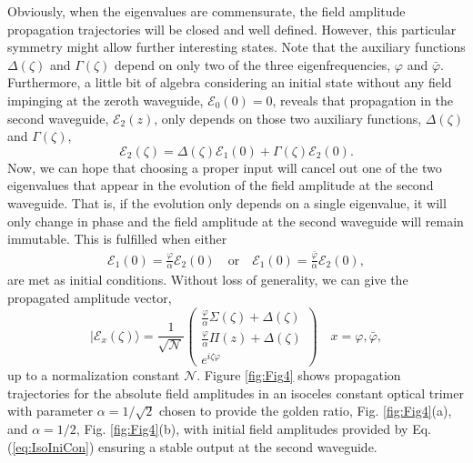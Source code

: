 \documentclass[9pt,twocolumn,twoside]{osajnl}
\begin{document}
Obviously, when the eigenvalues are commensurate, the field amplitude propagation trajectories will be closed and well defined. 
However, this particular symmetry might allow further interesting states.
Note that the auxiliary functions $\Delta(\zeta)$ and $\Gamma(\zeta)$ depend on only two of the three eigenfrequencies, $\varphi$ and $\bar{\varphi}$. 
Furthermore, a little bit of algebra considering an initial state without any field impinging at the zeroth waveguide, $\mathcal{E}_{0}(0)=0$, reveals that propagation in the second waveguide, $\mathcal{E}_{2}(z)$, only depends on those two auxiliary functions, $\Delta(\zeta)$ and $\Gamma(\zeta)$,
\begin{equation}
\mathcal{E}_{2}(\zeta) = \Delta(\zeta)\mathcal{E}_{1}(0)
+\Gamma(\zeta)\mathcal{E}_{2}(0).
\end{equation}
Now, we can hope that choosing a proper input will cancel out one of the two 
eigenvalues that appear in the evolution of the field amplitude at the second waveguide.
That is, if the evolution only depends on a single eigenvalue, it will only change in phase and the field amplitude at the second waveguide will remain immutable. 
This is fulfilled when either 
\begin{eqnarray}
\mathcal{E}_{1}(0)= \frac{\varphi}{\alpha} \mathcal{E}_{2}(0)\quad \mathrm{or} \quad
\mathcal{E}_{1}(0)= \frac{\bar{\varphi}}{\alpha} \mathcal{E}_{2}(0), \label{eq:IsoIniCon}
\end{eqnarray}
are met as initial conditions.
Without loss of generality, we can give the propagated amplitude vector,
\begin{equation} \label{eq:StatAmp}
\vert \mathcal{E}_{x}(\zeta) \rangle = \frac{1}{\sqrt{\mathcal{N}}}\left( \begin{array}{c}
\frac{\varphi}{\alpha} \Sigma(\zeta) + \Delta(\zeta) \\
\frac{\varphi}{\alpha} \Pi(z) + \Delta(\zeta) \\
e^{i\zeta\varphi}
\end{array} \right)	\quad x= \varphi, \bar{\varphi},
\end{equation}
up to a normalization constant $\mathcal{N}$.
Figure \ref{fig:Fig4} shows propagation trajectories for the absolute field amplitudes in an isoceles constant optical trimer with parameter $\alpha = 1 /\sqrt{2}$ chosen to provide the golden ratio, Fig. \ref{fig:Fig4}(a), and  $\alpha = 1/ 2$, Fig. \ref{fig:Fig4}(b), with initial field amplitudes provided by Eq.(\ref{eq:IsoIniCon}) ensuring a stable output at the second waveguide.
\end{document}
